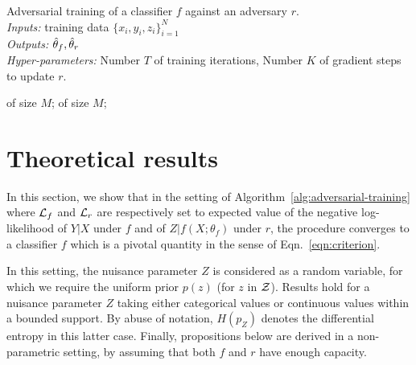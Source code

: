 \documentclass{article}
\theoremstyle{plain}
\begin{document}
\begin{algorithm}[t]
\caption{Adversarial training of a classifier $f$ against an adversary $r$.\\
{\it Inputs:} training data $\{ x_i, y_i, z_i \}_{i=1}^N$\\
{\it Outputs:} $\smash{\hat\theta_f}, \smash{\hat\theta_r}$\\
{\it Hyper-parameters:} Number $T$ of training iterations, Number $K$ of gradient steps to update $r$.}
\label{alg:adversarial-training}
\begin{algorithmic}[1]
         
             of size $M$;
        \EndFor
         of size $M$; 
    \EndFor
\end{algorithmic}
\end{algorithm}



\section{Theoretical results}
\label{sec:theory}

In this section, we show that in the setting of
Algorithm~\ref{alg:adversarial-training} where ${\cal L}_f$ and ${\cal L}_r$ are
respectively set to expected value of the negative log-likelihood of $Y|X$ under
$f$ and of $Z|f(X;\theta_f)$ under $r$, the procedure converges to a classifier
$f$ which is a pivotal quantity in the sense of Eqn.~\ref{eqn:criterion}.

In this setting, the nuisance parameter $Z$ is considered as a random variable,
for which we require the uniform prior $p(z)$ (for $z$ in ${\cal Z}$).  Results
hold for a nuisance parameter $Z$ taking either categorical values or continuous
values within a bounded support. By abuse of notation, $H(p_Z)$ denotes the
differential entropy in this latter case. Finally, propositions below are derived in a
non-parametric setting, by assuming that both $f$ and $r$ have enough capacity.
\end{document}
